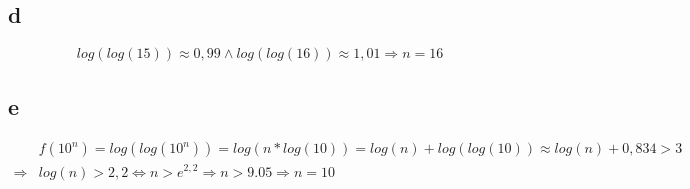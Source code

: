 \documentclass[a4paper,10pt]{article}
\begin{document}
\subsection*{d}

\begin{equation}
 log(log(15)) \approx 0,99 \land log(log(16)) \approx 1,01 \Rightarrow n = 16
\end{equation}

\subsection*{e}

\begin{align}
 & f(10^n) = log(log(10^n)) = log(n * log(10)) = log(n) + log(log(10)) \approx log(n) + 0,834 > 3\\
 \Rightarrow & log(n) > 2,2 \Leftrightarrow n > e^{2,2} \Rightarrow n > 9.05 \Rightarrow n = 10
\end{align}
\end{document}

